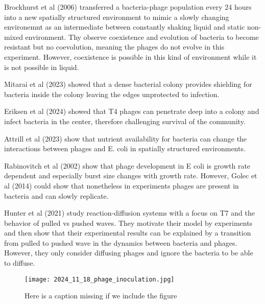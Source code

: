 Brockhurst et al (2006) transferred a bacteria-phage population every 24 hours into a new spatially structured environment to mimic a slowly changing environemnt as an intermediate between constantly shaking liquid and static non-mixed environment. Thy observe coexistence and evolution of bacteria to become resistant but no coevolution, meaning the phages do not evolve in this experiment. However, coexistence is possible in this kind of environment while it is not possible in liquid.

Mitarai et al (2023) showed that a dense bacterial colony provides shielding for bacteria inside the colony leaving the edges unprotected to infection.

Eriksen et al (2024) showed that T4 phages can penetrate deep into a colony and infect bacteria in the center, therefore challenging survival of the community.

Attrill et al (2023) show that nutrient availability for bacteria can change the interactions between phages and E. coli in spatially structured environments. 

Rabinovitch et al (2002) show that phage development in E coli is growth rate dependent and especially burst size changes with growth rate.
However, Golec et al (2014) could show that nonetheless in experiments phages are present in bacteria and can slowly replicate.

Hunter et al (2021) study reaction-diffusion systems with a focus on T7 and the behavior of pulled vs pushed waves. They motivate their model by experiments and then show that their experimental results can be explained by a transition from pulled to pushed wave in the dynamics between bacteria and phages. However, they only consider diffusing phages and ignore the bacteria to be able to diffuse.

\begin{figure}
\texttt{[image: 2024\_11\_18\_phage\_inoculation.jpg]}
\caption{Here is a caption missing if we include the figure}
\end{figure}